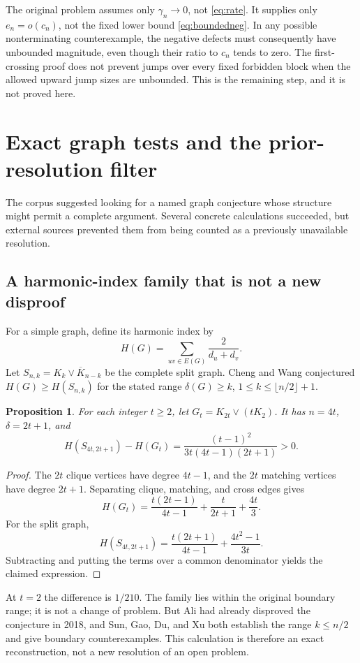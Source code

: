 \documentclass[11pt,a4paper]{article}
\newtheorem{proposition}[theorem]{Proposition}
\theoremstyle{definition}
\theoremstyle{remark}\newtheorem{remark}[theorem]{Remark}
\begin{document}
The original problem assumes only $\gamma_n\to0$, not
\eqref{eq:rate}. It supplies only $e_n=o(c_n)$, not the fixed
lower bound \eqref{eq:boundedneg}. In any possible nonterminating
counterexample, the negative defects must consequently have
unbounded magnitude, even though their ratio to $c_n$ tends to
zero. The first-crossing proof does not prevent jumps over every
fixed forbidden block when the allowed upward jump sizes are
unbounded. This is the remaining step, and it is not proved here.

\section{Exact graph tests and the prior-resolution filter}
\label{sec:graphs}

The corpus suggested looking for a named graph conjecture whose
structure might permit a complete argument. Several concrete
calculations succeeded, but external sources prevented them from
being counted as a previously unavailable resolution.

\subsection{A harmonic-index family that is not a new disproof}

For a simple graph, define its harmonic index by
\[
 H(G)=\sum_{uv\in E(G)}\frac2{d_u+d_v}.
\]
Let $S_{n,k}=K_k\vee\overline K_{n-k}$ be the complete split
graph. Cheng and Wang \cite{CW} conjectured
$H(G)\ge H(S_{n,k})$ for the stated range
$\delta(G)\ge k$, $1\le k\le\lfloor n/2\rfloor+1$.

\begin{proposition}\label{prop:harmonic}
For each integer $t\ge2$, let $G_t=K_{2t}\vee(tK_2)$. It has
$n=4t$, $\delta=2t+1$, and
\[
 H(S_{4t,2t+1})-H(G_t)
 =\frac{(t-1)^2}{3t(4t-1)(2t+1)}>0.
\]
\end{proposition}
\begin{proof}
The $2t$ clique vertices have degree $4t-1$, and the $2t$ matching
vertices have degree $2t+1$. Separating clique, matching, and
cross edges gives
\[
 H(G_t)=\frac{t(2t-1)}{4t-1}+\frac{t}{2t+1}+\frac{4t}{3}.
\]
For the split graph,
\[
 H(S_{4t,2t+1})=\frac{t(2t+1)}{4t-1}
                  +\frac{4t^2-1}{3t}.
\]
Subtracting and putting the terms over a common denominator yields
the claimed expression.
\end{proof}

At $t=2$ the difference is $1/210$. The family lies within the
original boundary range; it is not a change of problem. But Ali
\cite{Ali} had already disproved the conjecture in 2018, and
Sun, Gao, Du, and Xu \cite{Sun} both establish the range $k\le n/2$
and give boundary counterexamples. This calculation is therefore
an exact reconstruction, not a new resolution of an open problem.
\end{document}
